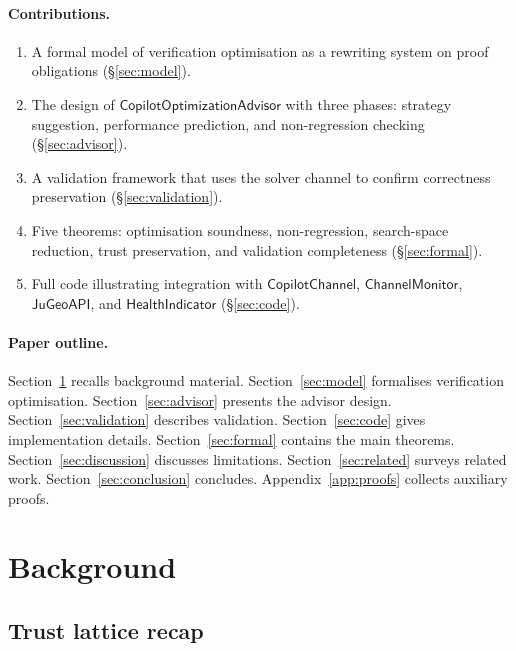 \documentclass[11pt]{article}
\newcommand{\OptAdv}{\mathsf{CopilotOptimizationAdvisor}}
\newcommand{\CopChan}{\mathsf{CopilotChannel}}
\newcommand{\ChanMon}{\mathsf{ChannelMonitor}}
\newcommand{\HealthInd}{\mathsf{HealthIndicator}}
\newcommand{\JuGeoAPI}{\mathsf{JuGeoAPI}}
\begin{document}
\paragraph{Contributions.}
\begin{enumerate}
\item A formal model of verification optimisation as a
      rewriting system on proof obligations (\S\ref{sec:model}).
\item The design of $\OptAdv$ with three phases:
      strategy suggestion, performance prediction, and
      non-regression checking (\S\ref{sec:advisor}).
\item A validation framework that uses the solver channel
      to confirm correctness preservation (\S\ref{sec:validation}).
\item Five theorems: optimisation soundness, non-regression,
      search-space reduction, trust preservation, and
      validation completeness (\S\ref{sec:formal}).
\item Full \Python{} code illustrating integration with
      $\CopChan$, $\ChanMon$, $\JuGeoAPI$, and
      $\HealthInd$ (\S\ref{sec:code}).
\end{enumerate}

\paragraph{Paper outline.}
Section~\ref{sec:background} recalls background material.
Section~\ref{sec:model} formalises verification optimisation.
Section~\ref{sec:advisor} presents the advisor design.
Section~\ref{sec:validation} describes validation.
Section~\ref{sec:code} gives implementation details.
Section~\ref{sec:formal} contains the main theorems.
Section~\ref{sec:discussion} discusses limitations.
Section~\ref{sec:related} surveys related work.
Section~\ref{sec:conclusion} concludes.
Appendix~\ref{app:proofs} collects auxiliary proofs.

\section{Background}\label{sec:background}

\subsection{Trust lattice recap}
\end{document}
